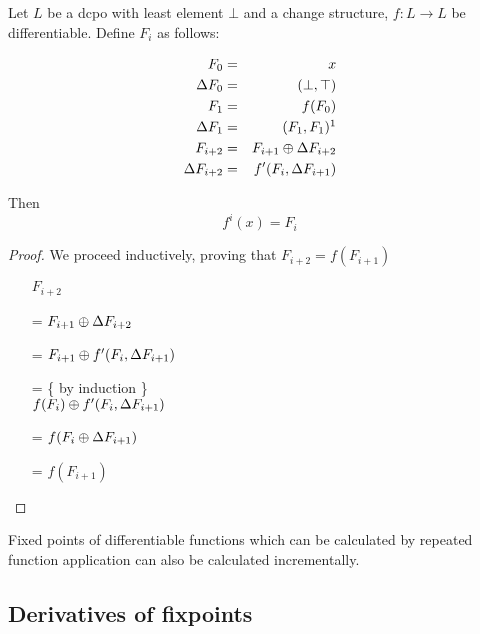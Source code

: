 \begin{thm}
\label{thm:diffIter}
  Let $L$ be a dcpo with least element $\bot$ and a change structure, $f: L \rightarrow L$ be
  differentiable. Define $F_i$ as follows:

  \begin{eqnarray*}
  F_0 & = & x\\
  \Delta F_0 & = & (\bot, \top) \\
  F_1 & = & f(F_0)\\
  \Delta F_1 & = & (F_1, F_1) \footnotemark \\
  F_{i+2} & = & F_{i+1} \cplus \Delta F_{i+2} \\
  \Delta F_{i+2} & = & \derive{f}(F_i, \Delta F_{i+1}) \\
  \end{eqnarray*}

  Then 
  $$f^i(x) = F_i$$
\end{thm}


\begin{proof}
We proceed inductively, proving that $F_{i+2} = f(F_{i+1})$

\begin{itemize}
\item[ ]$F_{i+2}$
\item[=]
$
F_{i+1} \oplus \Delta F_{i+2}
$
\item[=]
$
F_{i+1} \oplus f'( F_i, \Delta F_{i+1})
$
\item[=] \{ by induction \}\\
$
f(F_i) \oplus f'(F_i, \Delta F_{i+1})
$
\item[=]
$
f(F_i \oplus \Delta F_{i+1})
$ 
\item[=]
$f(F_{i+1})$
\end{itemize}
\end{proof}

\begin{corollary}
\label{corollary:diffFP}
  Fixed points of differentiable functions which can be calculated by repeated
  function application can also be calculated incrementally.
\end{corollary}

\subsection{Derivatives of fixpoints}

